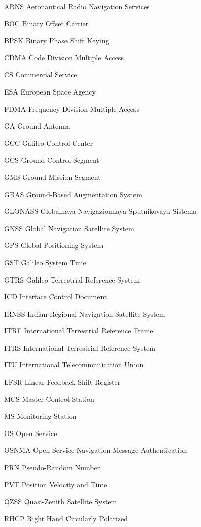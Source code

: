 \begin{abbreviations}

\item[ARNS] Aeronautical Radio Navigation Services
\item[BOC] Binary Offset Carrier
\item[BPSK] Binary Phase Shift Keying
\item[CDMA] Code Division Multiple Access
\item[CS] Commercial Service
\item[ESA] European Space Agency
\item[FDMA] Frequency Division Multiple Access
\item[GA] Ground Antenna
\item[GCC] Galileo Control Center
\item[GCS] Ground Control Segment
\item[GMS] Ground Mission Segment 
\item[GBAS] Ground-Based Augmentation System
\item[GLONASS] Globalnaya Navigazionnaya Sputnikovaya Sistema
\item[GNSS] Global Navigation Satellite System
\item[GPS] Global Positioning System
\item[GST] Galileo System Time
\item[GTRS] Galileo Terrestrial Reference System
\item[ICD] Interface Control Document
\item[IRNSS] Indian Regional Navigation Satellite System
\item[ITRF] International Terrestrial Reference Frame
\item[ITRS] International Terrestrial Reference System
\item[ITU] International Telecommunication Union
\item[LFSR] Linear Feedback Shift Register
\item[MCS] Master Control Station
\item[MS] Monitoring Station
\item[OS] Open Service
\item[OSNMA] Open Service Navigation Message Authentication
\item[PRN] Pseudo-Random Number
\item[PVT] Position Velocity and Time
\item[QZSS] Quasi-Zenith Satellite System
\item[RHCP] Right Hand Circularly Polarized

\end{abbreviations}
